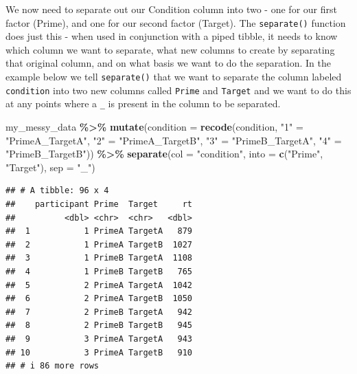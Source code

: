\documentclass[
]{book}
\newenvironment{Shaded}{\begin{snugshade}}{\end{snugshade}}
\newcommand{\AttributeTok}[1]{\textcolor[rgb]{0.13,0.29,0.53}{#1}}
\newcommand{\FunctionTok}[1]{\textcolor[rgb]{0.13,0.29,0.53}{\textbf{#1}}}
\newcommand{\NormalTok}[1]{#1}
\newcommand{\OtherTok}[1]{\textcolor[rgb]{0.56,0.35,0.01}{#1}}
\newcommand{\SpecialCharTok}[1]{\textcolor[rgb]{0.81,0.36,0.00}{\textbf{#1}}}
\newcommand{\StringTok}[1]{\textcolor[rgb]{0.31,0.60,0.02}{#1}}
\begin{document}
We now need to separate out our Condition column into two - one for our first factor (Prime), and one for our second factor (Target). The \texttt{separate()} function does just this - when used in conjunction with a piped tibble, it needs to know which column we want to separate, what new columns to create by separating that original column, and on what basis we want to do the separation. In the example below we tell \texttt{separate()} that we want to separate the column labeled \texttt{condition} into two new columns called \texttt{Prime} and \texttt{Target} and we want to do this at any points where a \texttt{\_} is present in the column to be separated.

\begin{Shaded}
\begin{Highlighting}[]
\NormalTok{my\_messy\_data }\SpecialCharTok{\%\textgreater{}\%} 
  \FunctionTok{mutate}\NormalTok{(}\AttributeTok{condition =} \FunctionTok{recode}\NormalTok{(condition,}
                            \StringTok{"1"} \OtherTok{=} \StringTok{"PrimeA\_TargetA"}\NormalTok{,}
                            \StringTok{"2"} \OtherTok{=} \StringTok{"PrimeA\_TargetB"}\NormalTok{, }
                            \StringTok{"3"} \OtherTok{=} \StringTok{"PrimeB\_TargetA"}\NormalTok{, }
                            \StringTok{"4"} \OtherTok{=} \StringTok{"PrimeB\_TargetB"}\NormalTok{)) }\SpecialCharTok{\%\textgreater{}\%}
  \FunctionTok{separate}\NormalTok{(}\AttributeTok{col =} \StringTok{"condition"}\NormalTok{, }\AttributeTok{into =} \FunctionTok{c}\NormalTok{(}\StringTok{"Prime"}\NormalTok{, }\StringTok{"Target"}\NormalTok{), }\AttributeTok{sep =} \StringTok{"\_"}\NormalTok{)}
\end{Highlighting}
\end{Shaded}

\begin{verbatim}
## # A tibble: 96 x 4
##    participant Prime  Target     rt
##          <dbl> <chr>  <chr>   <dbl>
##  1           1 PrimeA TargetA   879
##  2           1 PrimeA TargetB  1027
##  3           1 PrimeB TargetA  1108
##  4           1 PrimeB TargetB   765
##  5           2 PrimeA TargetA  1042
##  6           2 PrimeA TargetB  1050
##  7           2 PrimeB TargetA   942
##  8           2 PrimeB TargetB   945
##  9           3 PrimeA TargetA   943
## 10           3 PrimeA TargetB   910
## # i 86 more rows
\end{verbatim}
\end{document}
